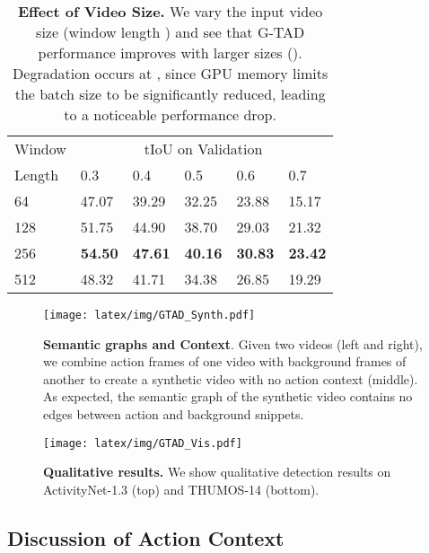 \documentclass[10pt,twocolumn,letterpaper]{article}
\begin{document}
\begin{table}[!tb]
\centering
\caption{\textbf{Effect of Video Size.} We vary the input video size (window length ) and see that G-TAD performance improves with larger sizes (). Degradation occurs at , since GPU memory limits the batch size to be significantly reduced, leading to a noticeable  performance drop.}
\small
\begin{tabular}{p{1.5cm}<{\centering}|p{0.6cm}<{\centering}p{0.6cm}<{\centering}p{0.6cm}<{\centering}p{0.6cm}<{\centering}p{0.6cm}<{\centering}}
\hline
Window & \multicolumn{5}{c}{tIoU on Validation}  \\
    Length     &  0.3 &  0.4 &  0.5 &  0.6 &  0.7 \\ \hline
    64              &47.07&39.29& 32.25 &23.88& 15.17\\
    128             & 51.75 & 44.90 & 38.70 & 29.03 & 21.32\\
    256             & \textbf{54.50} & \textbf{47.61} & \textbf{40.16} & \textbf{30.83} & \textbf{23.42} \\
    512             & 48.32 & 41.71 & 34.38 & 26.85 & 19.29 \\ \hline
\end{tabular}
\label{tab:abl_window}
\end{table}

\begin{figure}
    \centering
\texttt{[image: latex/img/GTAD\_Synth.pdf]}
    \caption{\textbf{Semantic graphs and Context}. Given two videos (left and right), we combine action frames of one video with background frames of another to create a synthetic video with no action context (middle). As expected, the semantic graph of the synthetic video contains no edges between action and background snippets. 
} 
    \label{fig:qual_results}
\end{figure}

\begin{figure*}[!h]
    \centering
    \vspace{-0.5cm}
    \texttt{[image: latex/img/GTAD\_Vis.pdf]}
    \caption{\textbf{Qualitative results.} We show qualitative detection results on ActivityNet-1.3 (top) and THUMOS-14 (bottom).}
    \label{fig:vis_video_THUMOS}
\end{figure*}

\subsection{Discussion of Action Context} 
\end{document}
